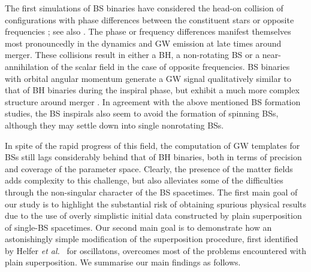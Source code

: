 The first simulations of BS binaries have considered the
head-on collision of configurations with phase differences
between the constituent stars or opposite frequencies
\cite{Palenzuela:2006wp}; see also
\cite{Choptuik:2009ww,Bezares:2017mzk}.
The phase or frequency differences manifest themselves most
pronouncedly in the dynamics and GW emission at late times
around merger. These collisions result in either
a BH, a non-rotating BS or a near-annihilation of the scalar
field in the case of opposite frequencies. BS binaries
with orbital angular momentum generate a GW signal
qualitatively similar to that of BH binaries during the
inspiral phase, but exhibit a much more complex structure around
merger \cite{Palenzuela:2007dm,Palenzuela:2017kcg}.
In agreement with the above mentioned BS formation
studies, the BS inspirals also seem to avoid the formation
of spinning BSs, although they may settle down into
single nonrotating BSs.

In spite of the
rapid progress of this field, the computation of GW templates
for BSs still lags considerably behind that of BH binaries,
both in terms of precision and coverage of the parameter space.
Clearly, the presence of the matter fields adds complexity to
this challenge, but also alleviates some of the difficulties
through
the non-singular character of the BS spacetimes. The first main goal
of our study is to highlight the substantial risk of obtaining
spurious physical results due to the use of overly simplistic
initial data constructed by plain superposition of single-BS
spacetimes. Our second main goal is to demonstrate
how an astonishingly
simple modification of the superposition procedure,
first identified by Helfer
{\it et al.}~\cite{Helfer:2018vtq} for oscillatons,
overcomes most of the problems encountered with plain
superposition. We summarise our main findings as follows.



